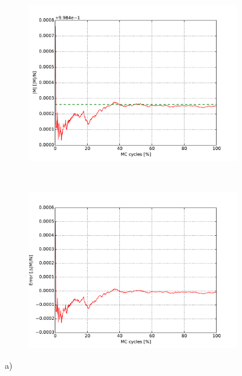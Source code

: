 \begin{figure}[H]
    \centering
    \begin{subfigure}{0.5\textwidth}
        \centering
        \includegraphics[width=\linewidth]{result/bilder/2x2/mabs22}
        \caption{}
    \end{subfigure}%
    ~ 
    \begin{subfigure}{0.5\textwidth}
        \centering
        \includegraphics[width=\linewidth]{result/bilder/2x2/mabserror22}
        \caption{}
    \end{subfigure}
    \caption{a) }
    \label{fig:22-energy}
\end{figure}

